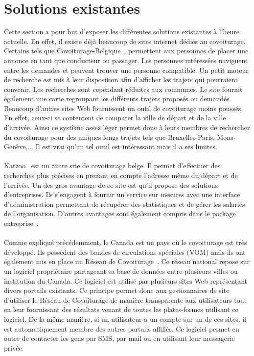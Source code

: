 \documentclass[12pt, a4paper, oneside]{article}
\begin{document}
\section{Solutions existantes}\label{sol-ex}
    Cette section a pour but d'exposer les différentes solutions existantes à l'heure actuelle. En effet, il existe déjà beaucoup de sites internet dédiés au covoiturage. Certains tels que Covoiturage-Belgique~\cite{covoiturage-belgique}, permettent aux personnes de placer une annonce en tant que conducteur ou passager. Les personnes intéressées naviguent entre les demandes et peuvent trouver une personne compatible. Un petit moteur de recherche est mis à leur disposition afin d'afficher les trajets qui pourraient convenir. Les recherches sont cependant réduites aux communes. Le site fournit également une carte regroupant les différents trajets proposés ou demandés. Beaucoup d'autres sites Web fournissent un outil de covoiturage moins poussés. En effet, ceux-ci se contentent de comparer la ville de départ et de la ville d'arrivée. Ainsi ce système assez léger permet donc à leurs membres de rechercher du covoiturage pour des uniques longs trajets tels que Bruxelles-Paris, Mons-Genève,... Il est vrai qu'un tel outil est intéressant mais il a ses limites.\\\\
    \indent Karzoo~\cite{karzoo.be} est un autre site de covoiturage belge. Il permet d'effectuer des recherches plus précises en prenant en compte l'adresse même du départ et de l'arrivée. Un des gros avantage de ce site est qu'il propose des solutions d'entreprises. Ils s'engagent à fournir un service sur mesures avec une interface d'administration permettant de récupérer des statistiques et de gérer les salariés de l'organisation. D'autres avantages sont également compris dans le package entreprise~\cite{karzoo.be-entreprise}.\\\\
    \indent Comme expliqué précédemment, le Canada est un pays où le covoiturage est très développé. Ils possèdent des bandes de circulations spéciales (VOM) mais ils ont également mis en place un Réseau de Covoiturage~\cite{covoiturage.ca}. Ce réseau national repose sur un logiciel propriétaire partageant sa base de données entre plusieurs villes ou institution du Canada. Ce logiciel est utilisé par plusieurs sites Web représentant divers portails existants. Ce principe permet donc aux gestionnaires de site d'utiliser le Réseau de Covoiturage de manière transparente aux utilisateurs tout en leur fournissant des résultats venant de toutes les plates-formes utilisant ce logiciel. De la même manière, si un utilisateur a un compte sur un de ces sites, il est automatiquement membre des autres portails affiliés. Ce logiciel permet en outre de contacter les gens par SMS, par mail ou en utilisant leur messagerie privée.\\\\
\end{document}
